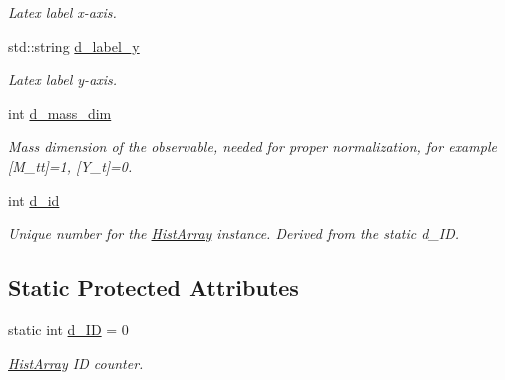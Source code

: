 \begin{DoxyCompactItemize}
\begin{DoxyCompactList}\small\item\em Latex label x-\/axis. \end{DoxyCompactList}\item 
\hypertarget{classHistArray_a884c9ad37bb3bc65bed3c33928c12f7d}{}std\+::string \hyperlink{classHistArray_a884c9ad37bb3bc65bed3c33928c12f7d}{d\+\_\+label\+\_\+y}\label{classHistArray_a884c9ad37bb3bc65bed3c33928c12f7d}

\begin{DoxyCompactList}\small\item\em Latex label y-\/axis. \end{DoxyCompactList}\item 
\hypertarget{classHistArray_ac682fdf0aeedf8f0b9fb8c4c4b1fee71}{}int \hyperlink{classHistArray_ac682fdf0aeedf8f0b9fb8c4c4b1fee71}{d\+\_\+mass\+\_\+dim}\label{classHistArray_ac682fdf0aeedf8f0b9fb8c4c4b1fee71}

\begin{DoxyCompactList}\small\item\em Mass dimension of the observable, needed for proper normalization, for example \mbox{[}M\+\_\+tt\mbox{]}=1, \mbox{[}Y\+\_\+t\mbox{]}=0. \end{DoxyCompactList}\item 
\hypertarget{classHistArray_a2b61b8b56cd4b0ca27d16855d4e1aef3}{}int \hyperlink{classHistArray_a2b61b8b56cd4b0ca27d16855d4e1aef3}{d\+\_\+id}\label{classHistArray_a2b61b8b56cd4b0ca27d16855d4e1aef3}

\begin{DoxyCompactList}\small\item\em Unique number for the \hyperlink{classHistArray}{Hist\+Array} instance. Derived from the static d\+\_\+\+I\+D. \end{DoxyCompactList}\end{DoxyCompactItemize}
\subsection*{Static Protected Attributes}
\begin{DoxyCompactItemize}
\item 
\hypertarget{classHistArray_a01616b3115c8b243e2bd924788d47589}{}static int \hyperlink{classHistArray_a01616b3115c8b243e2bd924788d47589}{d\+\_\+\+I\+D} = 0\label{classHistArray_a01616b3115c8b243e2bd924788d47589}

\begin{DoxyCompactList}\small\item\em \hyperlink{classHistArray}{Hist\+Array} I\+D counter. \end{DoxyCompactList}\end{DoxyCompactItemize}



